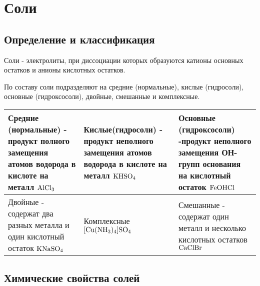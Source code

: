 \section{Соли}

\subsection{Определение и классификация}
Соли - электролиты, при диссоциации которых образуются катионы основных остатков и анионы кислотных остатков.


По составу соли подразделяют на средние (нормальные), кислые (гидросоли), основные (гидроксосоли), двойные, смешанные и комплексные.


\begin{tabular}{| p{4.1cm} | p{4.1cm} | p{4.1cm} }
    \hline
    Средние (нормальные) - продукт полного замещения атомов водорода в кислоте на металл $\ce{AlCl3}$ & Кислые(гидросоли) - продукт неполного замещения атомов водорода в кислоте на металл $\ce{KHSO4}$ & Основные (гидроксосоли) -продукт неполного замещения ОН-групп основания на кислотный остаток $\ce{FeOHCl}$ \\ \hline
    Двойные - содержат два разных металла и один кислотный остаток $\ce{KNaSO4}$ & Комплексные $\ce{[Cu(NH3)4]SO4}$ & Смешанные - содержат один металл и несколько кислотных остатков $\ce{CaClBr}$
\end{tabular}

\subsection{Химические свойства солей}

